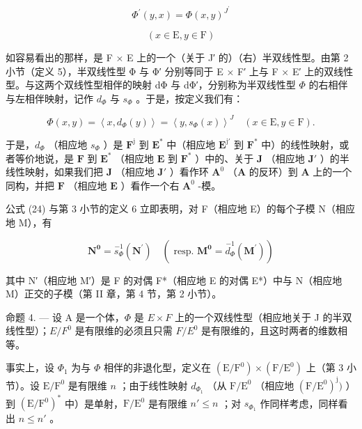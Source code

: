\[
\Phi^ {\prime} (y, x) = \Phi (x, y) ^ {J ^ {\prime}}
\]

\[
(x \in \mathrm{E}, y \in \mathrm{F})
\]

如容易看出的那样，是 F × E 上的一个（关于 J′ 的）（右）半双线性型。由第 2 小节（定义 5），半双线性型 Φ 与 Φ′ 分别等同于 E × F′ 上与 F × E′ 上的双线性型。与这两个双线性型相伴的映射 dΦ 与 dΦ′，分别称为半双线性型 \(\Phi\) 的右相伴与左相伴映射，记作 \(d_{\Phi}\) 与 \(s_{\Phi}\) 。于是，按定义我们有：

\[
\Phi (x, y) = \left\langle x, d _ {\Phi} (y) \right\rangle = \left\langle y, s _ {\Phi} (x) \right\rangle^ {J} \quad (x \in \mathrm{E}, y \in \mathrm{F}).\tag{24}
\]

于是，\(d_{\Phi}\) （相应地 \(s_{\Phi}\) ）是 \(\mathbf{F}^{\mathrm{j}}\) 到 \(\mathbf{E}^{*}\) 中（相应地 \(\mathbf{E}^{\mathrm{j}'}\) 到 \(\mathbf{F}^{*}\) 中）的线性映射，或者等价地说，是 \(\mathbf{F}\) 到 \(\mathbf{E}^{*}\) （相应地 \(\mathbf{E}\) 到 \(\mathbf{F}^{*}\) ）中的、关于 \(\mathbf{J}\) （相应地 \(\mathbf{J}'\) ）的半线性映射，如果我们把 \(\mathbf{J}\) （相应地 \(\mathbf{J}'\) ）看作环 \(\mathbf{A}^{0}\) （\(\mathbf{A}\) 的反环）到 \(\mathbf{A}\) 上的一个同构，并把 \(\mathbf{F}\) （相应地 \(\mathbf{E}\) ）看作一个右 \(\mathbf{A}^{0}\) -模。

公式 (24) 与第 3 小节的定义 6 立即表明，对 F（相应地 E）的每个子模 N（相应地 M），有

\[
\mathbf {N ^ {0}} = \stackrel {- 1} {s _ {\Phi}} (\mathbf {N ^ {\prime}}) \quad (\text { resp. } \mathbf {M ^ {0}} = \stackrel {- 1} {d _ {\Phi}} (\mathbf {M ^ {\prime}}))\tag{25}
\]

其中 N′（相应地 M′）是 F 的对偶 F*（相应地 E 的对偶 E*）中与 N（相应地 M）正交的子模（第 II 章，第 4 节，第 2 小节）。

命题 4. --- 设 A 是一个体，\(\Phi\) 是 \(E \times F\) 上的一个双线性型（相应地关于 J 的半双线性型）；\(E/F^{0}\) 是有限维的必须且只需 \(F/E^{0}\) 是有限维的，且这时两者的维数相等。

事实上，设 \(\Phi_{1}\) 为与 \(\Phi\) 相伴的非退化型，定义在 \((\mathrm{E} / \mathrm{F}^{0}) \times (\mathrm{F} / \mathrm{E}^{0})\) 上（第 3 小节）。设 \(\mathrm{E} / \mathrm{F}^{0}\) 是有限维 \(n\) ；由于线性映射 \(d_{\Phi_1}\) （从 \(\mathrm{F} / \mathrm{E}^{0}\) （相应地 \((\mathrm{F} / \mathrm{E}^{0})^{\mathrm{j}})\) ）到 \((\mathrm{E} / \mathrm{F}^{0})^{*}\) 中）是单射，\(\mathrm{F} / \mathrm{E}^{0}\) 是有限维 \(n' \leqslant n\) ；对 \(s_{\Phi_1}\) 作同样考虑，同样看出 \(n \leqslant n'\) 。

